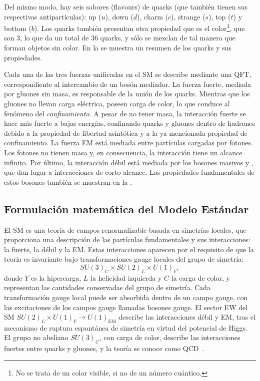 Del mismo modo, hay seis sabores (flavours) de quarks (que también tienen sus respectivas antipartículas): up (\(u\)), down (\(d\)), charm (\(c\)), strange (\(s\)), top (\(t\)) y bottom (\(b\)). Los quarks también presentan otra propiedad que es el color\footnote{No se trata de un color visible, si no de un n\'umero cu\'antico.}, que son 3, lo que da un total de 36 quarks, y sólo se mezclan de tal manera que forman objetos sin color. En la \Fig{\ref{fig:theory:sm:particles_interaction:particles}} se muestra un resumen de los quarks y sus propiedades.


Cada una de las tres fuerzas unificadas en el \ac{SM} se describe mediante una \ac{QFT}, correspondiente al intercambio de un bosón mediador.
La fuerza fuerte, mediada por gluones sin masa, es responsable de la unión de los quarks. Mientras que los gluones no llevan carga eléctrica, poseen carga de color, lo que conduce al fenómeno del \textit{confinamiento}. A pesar de no tener masa, la interacción fuerte se hace más fuerte a bajas energías, confinando quarks y gluones dentro de hadrones debido a la propiedad de libertad asintótica y a la ya mencionada propiedad de confinamiento.
La fuerza \ac{EM} está mediada entre partículas cargadas por fotones. Los fotones no tienen masa y, en consecuencia, la interacción tiene un alcance infinito.
Por último, la interacción débil está mediada por los bosones masivos \Wboson y \Zboson, que dan lugar a interacciones de corto alcance. Las propiedades fundamentales de estos bosones también se muestran en la \Fig{\ref{fig:theory:sm:particles_interaction:particles}}.









\subsection{Formulaci\'on matem\'atica del Modelo Est\'andar}
\label{subsec:theory:sm:mathematical}

El \ac{SM} es una teoría de campos renormalizable basada en simetrías locales, que proporciona una descripción de las partículas fundamentales y sus interacciones: la fuerte, la débil y la \ac{EM}. Estas interacciones aparecen por el requisito de que la teoría es invariante bajo transformaciones gauge locales del grupo de simetría:
\begin{equation*}
    SU(3)_{C} \times SU(2)_{L} \times U(1)_{Y},
\end{equation*}
donde \(Y\) es la hipercarga, \(L\) la helicidad izquierda y \(C\) la carga de color, y representan las cantidades conservadas del grupo de simetría. Cada transformación gauge local puede ser absorbida dentro de un campo gauge, con las excitaciones de los campos gauge llamadas bosones gauge. El sector \ac{EW} del \ac{SM} \(SU(2)_{L} \times U(1)_{Y} \to U(1)_{\text{EM}}\) describe las interacciones débil y \ac{EM}, tras el mecanismo de ruptura espontánea de simetría en virtud del potencial de Higgs. El grupo no abeliano \(SU(3)_C\), con carga de color, describe las interacciones fuertes entre quarks y gluones, y la teoría se conoce como \ac{QCD}~\cite{Ellis-1996-book}.

